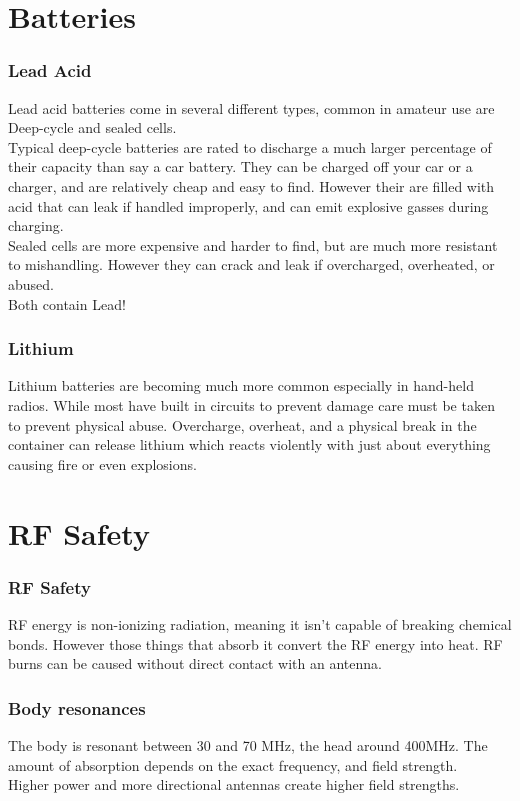 \documentclass[10pt]{beamer}
\begin{document}
\section{Batteries}
\begin{frame}
\frametitle{Lead Acid}
Lead acid batteries come in several different types, common in amateur use are Deep-cycle and sealed cells.\\
Typical deep-cycle batteries are rated to discharge a much larger percentage of their capacity than say a car battery. They can be charged off your car or a charger, and are relatively cheap and easy to find. However their are filled with acid that can leak if handled improperly, and can emit explosive gasses during charging.\\
Sealed cells are more expensive and harder to find, but are much more resistant to mishandling. However they can crack and leak if overcharged, overheated, or abused.\\
Both contain Lead! 
\end{frame}

\begin{frame}
\frametitle{Lithium}
Lithium batteries are becoming much more common especially in hand-held radios. While most have built in circuits to prevent damage care must be taken to prevent physical abuse. Overcharge, overheat, and a physical break in the container can release lithium which reacts violently with just about everything causing fire or even explosions.
\end{frame}

\section{RF Safety}
\begin{frame}
\frametitle{RF Safety}
RF energy is non-ionizing radiation, meaning it isn't capable of breaking chemical bonds. However those things that absorb it convert the RF energy into heat. RF burns can be caused without direct contact with an antenna.
\end{frame}

\begin{frame}
\frametitle{Body resonances}
The body is resonant between 30 and 70 MHz, the head around 400MHz. The amount of absorption depends on the exact frequency, and field strength.\\
Higher power and more directional antennas create higher field strengths.
\end{frame}
\end{document}
